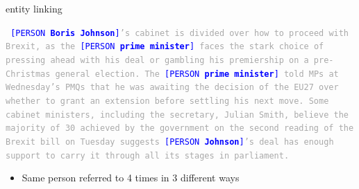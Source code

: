 \documentclass[landscape]{jhuslides3C}
\begin{document}

\slide{}
\vspace{85mm}
\begin{center}
{\huge entity linking}
\end{center}


\vfill
\textcolor{darkgrey}{\begin{flushleft} \tt
\newcommand{\person}[1]{\textcolor{blue}{{\small [PERSON} #1{\small ]}}}
\newcommand{\gpe}[1]{#1}
\newcommand{\nedate}[1]{#1}
\newcommand{\event}[1]{#1}
\newcommand{\nenumber}[1]{#1}
\person{\textbf{Boris Johnson}}'s \gpe{cabinet} is divided over how to proceed with Brexit, as the \person{\textbf{prime minister}} faces the stark choice of pressing ahead with his deal or gambling his premiership on a \nedate{pre-Christmas} general election. The \person{\textbf{prime minister}} told MPs at \nedate{Wednesday}'s \event{PMQs} that he was awaiting the decision of the \gpe{EU27} over whether to grant an extension before settling his next move. Some cabinet ministers, including the secretary, Julian Smith, believe the majority of \nenumber{30} achieved by the \gpe{government} on the second reading of the \event{Brexit} bill on \nedate{Tuesday} suggests \person{\textbf{Johnson}}'s deal has enough support to carry it through all its stages in \gpe{parliament}.
\end{flushleft}}
\vfill
\begin{itemize}
\item Same person referred to 4 times in 3 different ways
\end{itemize}
\vfill

\end{document}
